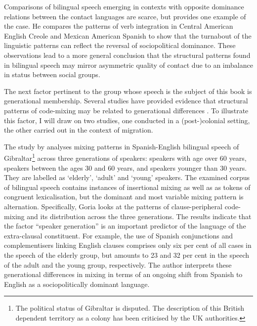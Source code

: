 \noindent Comparisons of bilingual speech emerging in contexts with opposite dominance relations between the contact languages are scarce, but \citet[][223--224]{muysken-bilingual-2000} provides one example of the case. He compares the patterns of verb integration in Central American English Creole \citep[based  on][]{herzfeld-80, herzfeld-83} and Mexican American Spanish \citep[based on][]{pfaff-constraints-1979} to show that the turnabout of the linguistic patterns can reflect the reversal of sociopolitical dominance. These observations lead to a more general conclusion that the structural patterns found in bilingual speech may mirror asymmetric quality of contact due to an imbalance in status between social groups.

The next factor pertinent to the group whose speech is the subject of this book is generational membership. Several studies have provided evidence that structural patterns of code-mixing may be related to generational differences \citep[for a review, see][224--227]{muysken-bilingual-2000}. To illustrate this factor, I will draw on two studies, one conducted in a (post-)colonial setting, the other carried out in the context of migration. 

The study by \citet{goria-road} analyses mixing patterns in Spanish-English bilingual speech of Gibraltar\footnote{The political status of Gibraltar is disputed. The description of this British dependent territory as a colony has been criticised by the UK authorities.} across three generations of speakers: speakers with age over 60 years, speakers between the ages 30 and 60 years, and speakers younger than 30 years. They are labelled as `elderly', `adult' and `young' speakers. The examined corpus of bilingual speech contains instances of insertional mixing as well as as tokens of congruent lexicalisation, but the dominant and most variable mixing pattern is alternation. Specifically, Goria looks at the patterns of clause-peripheral code-mixing and its distribution across the three generations. The results indicate that the factor ``speaker generation'' is an important predictor of the language of the extra-clausal constituent. For example, the use of Spanish conjunctions and complementisers linking English clauses comprises only six per cent of all cases in the speech of the elderly group, but amounts to 23 and 32 per cent in the speech of the adult and the young group, respectively. The author interprets these generational differences in mixing in terms of an ongoing shift from Spanish to English as a sociopolitically dominant language.

